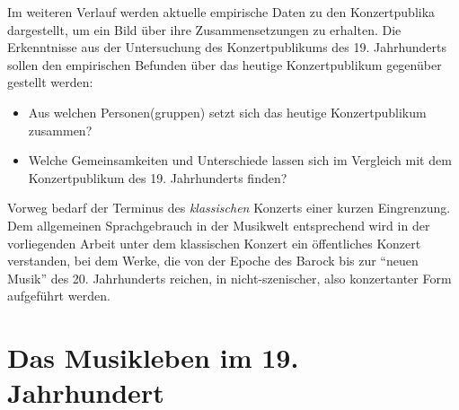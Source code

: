 \documentclass[a4paper, german, oneside]{scrbook}
\begin{document}
Im weiteren Verlauf werden aktuelle empirische Daten zu den Konzertpublika dargestellt, um ein Bild über ihre Zusammensetzungen zu erhalten. Die Erkenntnisse aus der Untersuchung des Konzertpublikums des 19. Jahrhunderts sollen den empirischen Befunden über das heutige Konzertpublikum gegenüber gestellt werden:

\begin{itemize}
	\item Aus welchen Personen(gruppen) setzt sich das heutige Konzertpublikum zusammen?
	\item Welche Gemeinsamkeiten und Unterschiede lassen sich im Vergleich mit dem Konzertpublikum des 19. Jahrhunderts finden?
\end{itemize}

Vorweg bedarf der Terminus des \emph{klassischen} Konzerts einer kurzen Eingrenzung. Dem allgemeinen Sprachgebrauch in der Musikwelt entsprechend wird in der vorliegenden Arbeit unter dem klassischen Konzert ein öffentliches Konzert verstanden, bei dem Werke, die von der Epoche des Barock bis zur \enquote{neuen Musik} des 20. Jahrhunderts reichen, in nicht-szenischer, also konzertanter Form aufgeführt werden. 








\chapter{Das Musikleben im 19. Jahrhundert}
\label{19jh}
\end{document}
